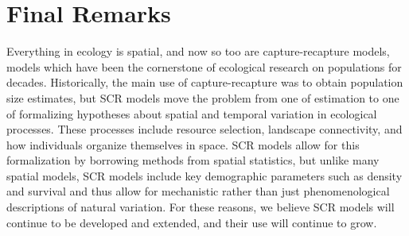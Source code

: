 \section{Final Remarks}

Everything in ecology is spatial, and now so too are capture-recapture
models, models which have been the cornerstone of ecological research
on populations for decades.  Historically, the main use of
capture-recapture was to obtain population size estimates, but SCR
models move the problem from one of estimation to one of formalizing
hypotheses about spatial and temporal variation in ecological
processes.
These processes include resource selection, landscape connectivity, and
how individuals organize themselves in space. SCR models allow for
this formalization by borrowing methods from spatial statistics,
but unlike many spatial models, SCR models include key demographic
parameters such as density and survival and thus allow for mechanistic
rather than just phenomenological descriptions of natural variation.
For these reasons, we believe SCR models will continue to be developed
and extended, and their use will continue to grow.

